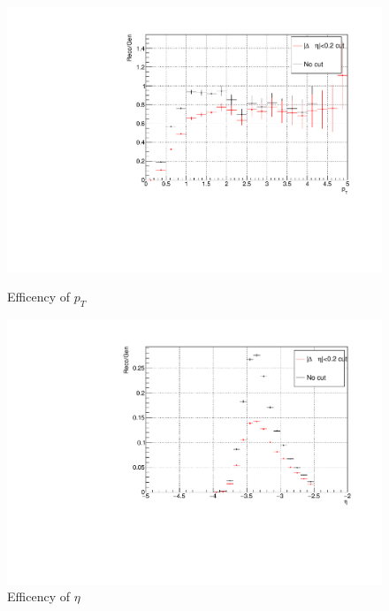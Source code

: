             \begin{figure}[htbp]
                \centering
                \begin{minipage}{0.45\textwidth}
                    \centering
                    \includegraphics[width=\textwidth]{fig/3_5_6_efficiency_pt.pdf}
                    \captionsetup{labelformat=empty}
                    \caption{Efficency of $p_T$}
                \end{minipage}
                \hfill
                \begin{minipage}{0.45\textwidth}
                \centering
                    \includegraphics[width=\textwidth]{fig/3_5_6_efficiency_eta.pdf}
                    \captionsetup{labelformat=empty}
                    \caption{Efficency of $\eta$}
                \end{minipage}

\end{figure}
